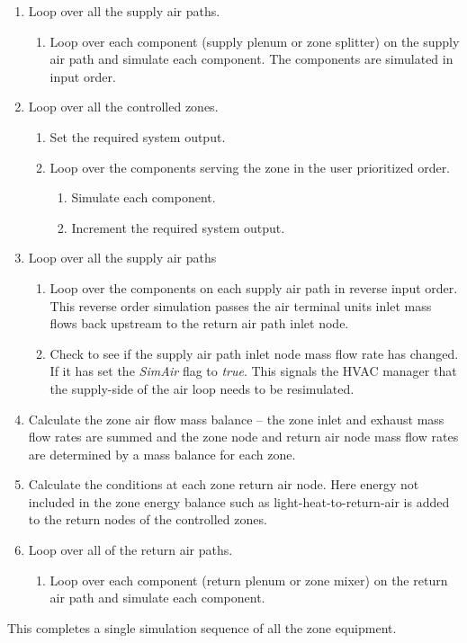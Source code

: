 \begin{enumerate}
\def\labelenumi{\arabic{enumi}.}
\def\labelenumii{\alph{enumii}.}
\def\labelenumiii{\roman{enumiii}.}
  \item
    Loop over all the supply air paths.
    \begin{enumerate}
      \item
        Loop over each component (supply plenum or zone splitter) on the supply air path and simulate each component. The components are simulated in input order.
    \end{enumerate}
  \item
    Loop over all the controlled zones.
    \begin{enumerate}
      \item
        Set the required system output.
      \item
        Loop over the components serving the zone in the user prioritized order.
        \begin{enumerate}
          \item
            Simulate each component.
          \item
            Increment the required system output.
        \end{enumerate}
    \end{enumerate}
  \item
    Loop over all the supply air paths
    \begin{enumerate}
      \item
        Loop over the components on each supply air path in reverse input order. This reverse order simulation passes the air terminal units inlet mass flows back upstream to the return air path inlet node.
      \item
        Check to see if the supply air path inlet node mass flow rate has changed. If it has set the \emph{SimAir} flag to \emph{true}. This signals the HVAC manager that the supply-side of the air loop needs to be resimulated.
    \end{enumerate}
  \item
    Calculate the zone air flow mass balance -- the zone inlet and exhaust mass flow rates are summed and the zone node and return air node mass flow rates are determined by a mass balance for each zone.
  \item
    Calculate the conditions at each zone return air node. Here energy not included in the zone energy balance such as light-heat-to-return-air is added to the return nodes of the controlled zones.
  \item
    Loop over all of the return air paths.
    \begin{enumerate}
      \item
        Loop over each component (return plenum or zone mixer) on the return air path and simulate each component.
    \end{enumerate}
\end{enumerate}

This completes a single simulation sequence of all the zone equipment.
